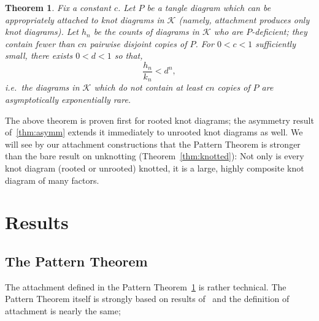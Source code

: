 \documentclass[submission%
]{dmtcs}
\newcommand{\KnotDiaClass}{\mathscr{K}}
\newcommand{\KnotDiaCard}{k}
\newtheorem{theorem}{Theorem}
\begin{document}
\begin{theorem}
  \label{thm:pattern}
  Fix a constant $c$. Let $P$ be a tangle diagram which can be
  appropriately attached to knot diagrams in $\KnotDiaClass$ (namely,
  attachment produces only knot diagrams). Let $h_n$ be the counts of
  diagrams in $\KnotDiaClass$ who are \emph{$P$-deficient}; they
  contain fewer than $cn$ pairwise disjoint copies of $P$. For $0 < c
  < 1$ sufficiently small, there exists $0 < d < 1$ so that,
  \begin{displaymath}
    \frac{h_n}{\KnotDiaCard_n} < d^n,
  \end{displaymath}
  \textit{i.e.}\ the diagrams in $\KnotDiaClass$ which do not contain at least
  $cn$ copies of $P$ are asymptotically exponentially rare.
\end{theorem}

The above theorem is proven first for rooted knot diagrams; the
asymmetry result of~\ref{thm:asymm} extends it immediately to unrooted
knot diagrams as well. We will see by our attachment constructions
that the Pattern Theorem is stronger than the bare result on
unknotting (Theorem~\ref{thm:knotted}): Not only is every knot diagram
(rooted or unrooted) knotted, it is a large, highly composite knot
diagram of many factors.

\section{Results}

\subsection{The Pattern Theorem}
\label{sec:pattern}

The attachment defined in the Pattern Theorem~\ref{thm:pattern} is
rather technical. The Pattern Theorem itself is strongly based on
results of~\cite{Bender1992104} and the definition of attachment is
nearly the same;
\end{document}
